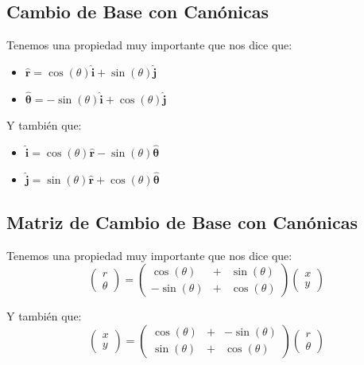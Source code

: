 \documentclass[12pt, fleqn]{report}                             %
\newcommand{\Wrap}[1]{\left( #1 \right)}                        %
\newcommand{\pVector}[1]{                                       %
        \ensuremath{\begin{pmatrix}#1\end{pmatrix}}                 %
    }
\newcommand{\uvec}[1]{\boldsymbol{\hat{\textbf{$#1$}}}}         %
\newcommand{\Cos}[1]{\cos\Wrap{#1}}
\newcommand{\Sin}[1]{\sin\Wrap{#1}}
\begin{document}
            \clearpage
            \subsection{Cambio de Base con Canónicas}
                Tenemos una propiedad muy importante que nos dice que:
                \begin{itemize}
                    \item $\uvec{r}      =  \Cos{\theta}\uvec{i} + \Sin{\theta} \uvec{j}$
                    \item $\uvec{\theta} = -\Sin{\theta}\uvec{i} + \Cos{\theta} \uvec{j}$
                \end{itemize}


                Y también que:
                \begin{itemize}
                    \item $\uvec{i} = \Cos{\theta}\uvec{r} - \Sin{\theta} \uvec{\theta}$
                    \item $\uvec{j} = \Sin{\theta}\uvec{r} + \Cos{\theta} \uvec{\theta}$
                \end{itemize}


            \subsection{Matriz de Cambio de Base con Canónicas}
                Tenemos una propiedad muy importante que nos dice que:
                \begin{equation}
                    \pVector{r \\ \theta} = 
                        \pVector{
                            \Cos{\theta} &+& \Sin{\theta} \\
                           -\Sin{\theta} &+& \Cos{\theta} 
                        }
                        \pVector{x \\ y}
                \end{equation}

                Y también que:
                \begin{equation}
                    \pVector{x \\ y} = 
                        \pVector{
                            \Cos{\theta} &+& -\Sin{\theta} \\
                            \Sin{\theta} &+& \Cos{\theta} 
                        }
                        \pVector{r \\ \theta}
                \end{equation}             
\end{document}
